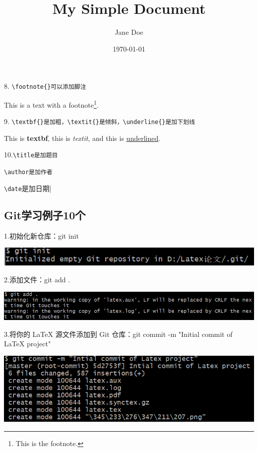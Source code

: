 \documentclass{article}
\begin{document}
	8.
	\verb|\footnote{}可以添加脚注|
	
	This is a text with a footnote\footnote{This is the footnote.}.
	
	9.
	\verb|\textbf{}是加粗，\textit{}是倾斜，\underline{}是加下划线|
	
	This is \textbf{textbf}, this is \textit{textit}, and this is \underline{underlined}.
	
	
	
	10.\verb|\title是加题目|\title{My Simple Document} 
	
	\verb|\author是加作者|\author{Jane Doe}
	   
	\verb|\date|是加日期|\date{\today}
	
	\subsection{Git学习例子10个}
	1.初始化新仓库：git init
	
	\noindent
	\begin{minipage}{\linewidth}
		\centering
		\includegraphics[width=0.5\linewidth]{example2.png}
		\label{fig:example}
	\end{minipage}
	
	
	2.添加文件：git add .
	
	
	\noindent
	\begin{minipage}{\linewidth}
		\centering
		\includegraphics[width=0.5\linewidth]{example3.png}
		\label{fig:example}
	\end{minipage}
	
	3.将你的 LaTeX 源文件添加到 Git 仓库：git commit -m "Initial commit of LaTeX project"
	
	\noindent
	\begin{minipage}{\linewidth}
		\centering
		\includegraphics[width=0.5\linewidth]{example4.png}
		\label{fig:example}
	\end{minipage}
	
\end{document}

